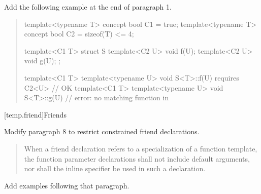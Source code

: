 Add the following example at the end of paragraph 1.

\begin{quote}
\begin{addedblock}
\enterexample
\begin{codeblock}
template<typename T> concept bool C1 = true;
template<typename T> concept bool C2 = sizeof(T) <= 4;

template<C1 T>
  struct S {
    template<C2 U> void f(U);
    template<C2 U> void g(U);
  };

template<C1 T> template<typename U> 
  void S<T>::f(U) requires C2<U> { } // OK
template<C1 T> template<typename U> 
  void S<T>::g(U) { }                // error: no matching function in 
\end{codeblock}
\exitexample
\end{addedblock}
\end{quote}


[temp.friend]{Friends}

Modify paragraph 8 to restrict constrained friend declarations.

\begin{quote}
\setcounter{Paras}{7}
\pnum
When a friend declaration refers to a specialization of a function
template, the function parameter declarations shall not include
default arguments,  nor shall the inline specifier be used in such a
declaration.
\end{quote}

Add examples following that paragraph.


